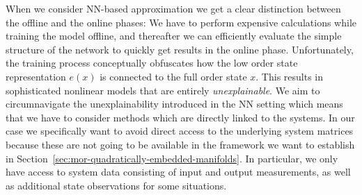 When we consider \ac{NN}-based approximation we get a clear distinction between the offline and the online phases: We have to perform expensive calculations while training the model offline, and thereafter we can efficiently evaluate the simple structure of the network to quickly get results in the online phase.
Unfortunately, the training process conceptually obfuscates how the low order state representation $e(x)$ is connected to the full order state $x$.
This results in sophisticated nonlinear models that are entirely \emph{unexplainable}.
We aim to circumnavigate the unexplainability introduced in the \ac{NN} setting which means that we have to consider methods which are directly linked to the systems.
In our case we specifically want to avoid direct access to the underlying system matrices because these are not going to be available in the framework we want to establish in Section~\ref{sec:mor-quadratically-embedded-manifolds}.
In particular, we only have access to system data consisting of input and output measurements, as well as additional state observations for some situations.
